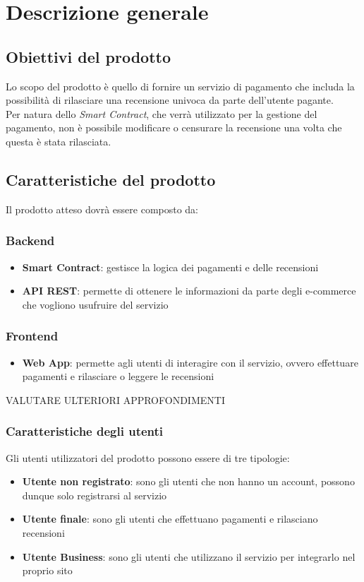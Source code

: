 \section{Descrizione generale}
    \subsection{Obiettivi del prodotto}
    Lo scopo del prodotto è quello di fornire un servizio di pagamento che includa la possibilità di rilasciare una recensione univoca da parte dell'utente pagante. \\
    Per natura dello \textit{Smart Contract}, che verrà utilizzato per la gestione del pagamento, non è possibile modificare o censurare la recensione una volta che questa è stata rilasciata. 

    \subsection{Caratteristiche del prodotto}
    Il prodotto atteso dovrà essere composto da:

        \subsubsection{Backend}
        \begin{itemize}
            \item \textbf{Smart Contract}: gestisce la logica dei pagamenti e delle recensioni
            \item \textbf{API REST}: permette di ottenere le informazioni da parte degli e-commerce che vogliono usufruire del servizio 
        \end{itemize}

        \subsubsection{Frontend}
        \begin{itemize}
            \item \textbf{Web App}: permette agli utenti di interagire con il servizio, ovvero effettuare pagamenti e rilasciare o leggere le recensioni
        \end{itemize}

        VALUTARE ULTERIORI APPROFONDIMENTI

    \subsubsection{Caratteristiche degli utenti}
    Gli utenti utilizzatori del prodotto possono essere di tre tipologie:
    \begin{itemize}
        \item \textbf{Utente non registrato}: sono gli utenti che non hanno un account, possono dunque solo registrarsi al servizio
        \item \textbf{Utente finale}: sono gli utenti che effettuano pagamenti e rilasciano recensioni
        \item \textbf{Utente Business}: sono gli utenti che utilizzano il servizio per integrarlo nel proprio sito
    \end{itemize}

